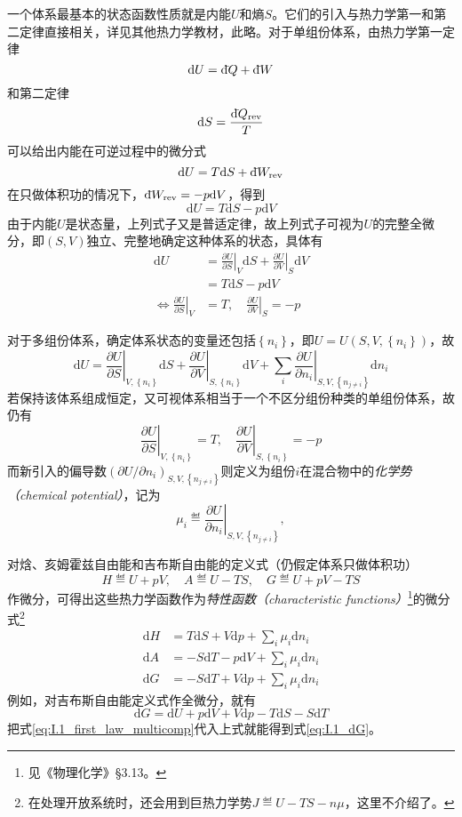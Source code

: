 \documentclass[main.tex]{subfiles}
\begin{document}
一个体系最基本的状态函数性质就是内能$U$和熵$S$。它们的引入与热力学第一和第二定律直接相关，详见其他热力学教材，此略。对于单组份体系，由热力学第一定律
\[\mathrm{d}U=\mathrm{d}\hspace*{-0.08em}\bar{}\hspace*{0.1em} Q+\mathrm{d}\hspace*{-0.08em}\bar{}\hspace*{0.1em} W\]
和第二定律
\[\mathrm{d} S=\frac{\mathrm{d}\hspace*{-0.08em}\bar{}\hspace*{0.1em} Q_\text{rev}}{T}\]
可以给出内能在可逆过程中的微分式
\[\mathrm{d}U=T\mathrm{d}S+\mathrm{d}\hspace*{-0.08em}\bar{}\hspace*{0.1em} W_\text{rev}\]
在只做体积功的情况下，$\mathrm{d}\hspace*{-0.08em}\bar{}\hspace*{0.1em} W_\text{rev}=-p\mathrm{d}V$，得到
\[\mathrm{d}U=T\mathrm{d}S-p\mathrm{d}V\]
由于内能$U$是状态量，上列式子又是普适定律，故上列式子可视为$U$的完整全微分，即$\left(S,V\right)$独立、完整地确定这种体系的状态，具体有
\begin{align*}
  \mathrm{d}U                                                   & =\left.\frac{\partial U}{\partial S}\right|_V\mathrm{d}S+\left.\frac{\partial U}{\partial V}\right|_{S}\mathrm{d}V \\
                                                                & =T\mathrm{d}S-p\mathrm{d}V                                                                                         \\
  \Leftrightarrow\left.\frac{\partial U}{\partial S}\right|_{V} & =T,\quad\left.\frac{\partial U}{\partial V}\right|_{S}=-p
\end{align*}

对于多组份体系，确定体系状态的变量还包括$\left\{n_i\right\}$，即$U=U\left(S,V,\left\{n_i\right\}\right)$，故
\begin{equation}\label{eq:I.1_first_law_multicomp}
  \mathrm{d}U=\left.\frac{\partial U}{\partial S}\right|_{V,\left\{n_i\right\}}\mathrm{d}S+\left.\frac{\partial U}{\partial V}\right|_{S,\left\{n_i\right\}}\mathrm{d}V+\sum_i\left.\frac{\partial U}{\partial n_i}\right|_{S,V,\left\{n_{j\neq i}\right\}}\mathrm{d}n_i
\end{equation}
若保持该体系组成恒定，又可视体系相当于一个不区分组份种类的单组份体系，故仍有
\[\left.\frac{\partial U}{\partial S}\right|_{V,\left\{n_i\right\}}=T,\quad\left.\frac{\partial U}{\partial V}\right|_{S,\left\{n_i\right\}}=-p\]
而新引入的偏导数$\left(\partial U/\partial n_i\right)_{S,V,\left\{n_{j\neq i}\right\}}$则定义为组份$i$在混合物中的\emph{化学势（chemical potential）}，记为
\[\mu_i\eqdef\left.\frac{\partial U}{\partial n_i}\right|_{S,V,\left\{n_{j\neq i}\right\}},\]

对焓、亥姆霍兹自由能和吉布斯自由能的定义式（仍假定体系只做体积功）
\[H\eqdef U+pV,\quad A\eqdef U-TS,\quad G\eqdef U+pV-TS\]
作微分，可得出这些热力学函数作为\emph{特性函数（characteristic functions）}\footnote{见《物理化学》\S 3.13。}的微分式\footnote{在处理开放系统时，还会用到巨热力学势$J\eqdef U-TS-n\mu$，这里不介绍了。}
\begin{align}
  \mathrm{d}H & = T\mathrm{d}S+V\mathrm{d}p+\sum_i\mu_i\mathrm{d}n_i\label{eq:I.1_dH} \\
  \mathrm{d}A & =-S\mathrm{d}T-p\mathrm{d}V+\sum_i\mu_i\mathrm{d}n_i\label{eq:I.1_dA} \\
  \mathrm{d}G & =-S\mathrm{d}T+V\mathrm{d}p+\sum_i\mu_i\mathrm{d}n_i\label{eq:I.1_dG}
\end{align}
例如，对吉布斯自由能定义式作全微分，就有
\[\mathrm{d}G=\mathrm{d}U+p\mathrm{d}V+V\mathrm{d}p-T\mathrm{d}S-S\mathrm{d}T\]
把式\eqref{eq:I.1_first_law_multicomp}代入上式就能得到式\eqref{eq:I.1_dG}。
\end{document}
